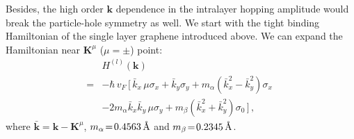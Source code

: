 \documentclass[aps,prx,10pt,twocolumn,superscriptaddress]{revtex4}
\def\angstrom{\mbox{\normalfont\AA}}
\def\angstrom{\mbox{\normalfont\AA}}
\begin{document}
Besides, the high order $\textbf{k}$ dependence in the intralayer hopping amplitude would break the particle-hole symmetry as well. We start with the tight binding Hamiltonian of the single layer graphene introduced above. We can expand the Hamiltonian near $\textbf{K}^{\mu}$ ($\mu=\pm$) point:
\begin{equation}
\begin{split}
&H^{(l)}(\textbf{k})\\
=&-\hbar\,v_{F}\,[\,\bar{k}_{x}\,\mu\sigma_{x}+\bar{k}_{y}\sigma_{y}+m_{\alpha}(\bar{k}^{2}_{x}-\bar{k}^{2}_{y})\sigma_{x}\;\\
&-2m_{\alpha}\bar{k}_{x}\bar{k}_{y}\,\mu\sigma_{y}+m_{\beta}(\bar{k}_{x}^{2}+\bar{k}_{y}^{2})\sigma_{0}\,]\,,
\end{split}
\end{equation}
where $\bar{\textbf{k}}=\textbf{k}-\textbf{K}^{\mu}$, $m_{\alpha}\!=\!0.4563\,\angstrom$ and $m_{\beta}\!=\!0.2345\,\angstrom$.
\end{document}
